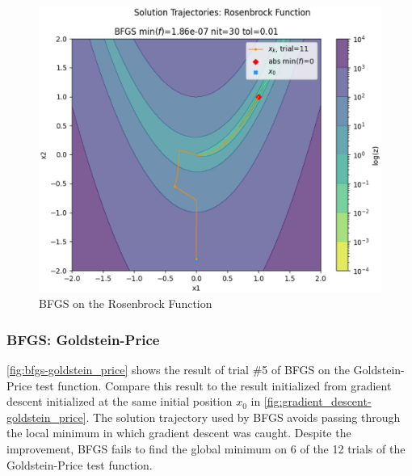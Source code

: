 \documentclass{vgtc}                          %
\begin{document}
\begin{figure}[tb]
\centering
\includegraphics[width=\columnwidth]{figures/pictures/images/bfgs-rosenbrock-plot2d-11.eps}
\caption{BFGS on the Rosenbrock Function}
\label{fig:bfgs-rosenbrock}
\end{figure}

\subsubsection{BFGS: Goldstein-Price}

\autoref{fig:bfgs-goldstein_price} shows the result of trial \#5 of BFGS on the Goldstein-Price test function. Compare this result to the result initialized from gradient descent initialized at the same initial position $x_0$ in \autoref{fig:gradient_descent-goldstein_price}. The solution trajectory used by BFGS avoids passing through the local minimum in which gradient descent was caught. Despite the improvement, BFGS fails to find the global minimum on 6 of the 12 trials of the Goldstein-Price test function.
\end{document}
